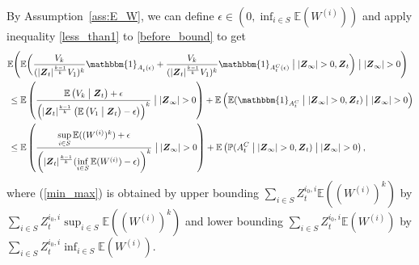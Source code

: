 \documentclass[preprint,3p,12pt]{elsarticle}
\theoremstyle{definition}
\newcommand{\A}[1][]{A_t^{#1}(\epsilon)}
\newcommand{\z}[1][i_0, i]{Z_t^{#1}}
\newcommand{\V}[1]{V_{#1}}
\begin{document}
By Assumption~\ref{ass:E_W}, we can define $\epsilon \in (0, \inf_{i \in S} \mathbb{E}(W^{(i)}))$ and apply inequality \eqref{less_than1} to \eqref{before_bound} to get 
    \begin{align}
         \mathbb{E}\Bigg(\mathbb{E}&\bigg(\frac{\V{k}}
    {(|\boldsymbol{Z}_t|^{\frac{k-1}{k}}\V{1})^k} \mathbbm{1}_{\A} + %
    \frac{\V{k}}
    {(|\boldsymbol{Z}_t|^{\frac{k-1}{k}}\V{1})^k} \mathbbm{1}_{\A[C]}
    \bigm| |\boldsymbol{Z}_{\infty}| > 0,\boldsymbol{Z}_t  \bigg)\bigm| |\boldsymbol{Z}_{\infty}| > 0\Bigg)\notag\\
     \le \mathbb{E}&\left(\frac{\mathbb{E}\left(\V{k}\bigm|  \boldsymbol{Z}_t\right)+\epsilon}
    {\left(|\boldsymbol{Z}_t|^{\frac{k-1}{k}}\left(\mathbb{E}\left(\V{1}\bigm|  \boldsymbol{Z}_t\right)-\epsilon\right)\right)^k}\bigm| |\boldsymbol{Z}_{\infty}| > 0\right)+ 
    \mathbb{E}\left(\mathbb{E}(\mathbbm{1}_{A^C_t}\bigm| |\boldsymbol{Z}_{\infty}| > 0, \boldsymbol{Z}_t) \bigm| |\boldsymbol{Z}_{\infty}| > 0\right)\label{eq:close_to_mean} \\
     \le \mathbb{E}&\left(\frac{\sup\limits_{i \in S}\mathbb{E}((W^{(i)})^k)+\epsilon}
    {\left(|\boldsymbol{Z}_t|^{\frac{k-1}{k}}(\inf\limits_{i \in S}\mathbb{E}(W^{(i)})-\epsilon)\right)^k}\bigm| |\boldsymbol{Z}_{\infty}| > 0\right)+ 
    \mathbb{E}\left(\mathbb{P}(A^C_t\bigm| |\boldsymbol{Z}_{\infty}| > 0, \boldsymbol{Z}_t)\bigm| |\boldsymbol{Z}_{\infty}| > 0\right), \label{min_max} 
\end{align}%
where (\ref{min_max}) is obtained by upper bounding $\sum_{i \in S}\z \mathbb{E}((W^{(i)})^k)$ by $\sum_{i \in S}\z \sup_{i \in S}\mathbb{E}((W^{(i)})^k)$ and lower bounding $\sum_{i \in S}\z \mathbb{E}(W^{(i)})$ by $\sum_{i \in S}\z \inf_{i \in S}\mathbb{E}(W^{(i)})$.
\end{document}
